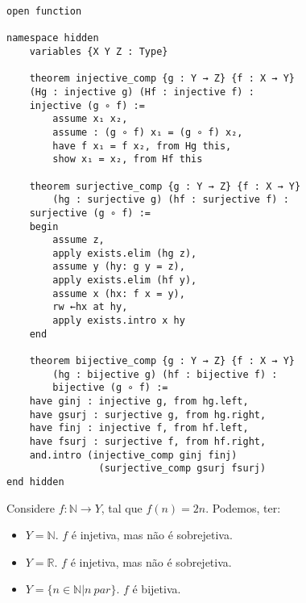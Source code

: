\begin{lstlisting}
open function

namespace hidden
    variables {X Y Z : Type}

    theorem injective_comp {g : Y → Z} {f : X → Y}
    (Hg : injective g) (Hf : injective f) :
    injective (g ∘ f) :=
        assume x₁ x₂,
        assume : (g ∘ f) x₁ = (g ∘ f) x₂,
        have f x₁ = f x₂, from Hg this,
        show x₁ = x₂, from Hf this

    theorem surjective_comp {g : Y → Z} {f : X → Y}
        (hg : surjective g) (hf : surjective f) :
    surjective (g ∘ f) :=
    begin
        assume z,
        apply exists.elim (hg z),
        assume y (hy: g y = z),
        apply exists.elim (hf y),
        assume x (hx: f x = y),
        rw ←hx at hy,
        apply exists.intro x hy
    end

    theorem bijective_comp {g : Y → Z} {f : X → Y}
        (hg : bijective g) (hf : bijective f) :
        bijective (g ∘ f) :=
    have ginj : injective g, from hg.left,
    have gsurj : surjective g, from hg.right,
    have finj : injective f, from hf.left,
    have fsurj : surjective f, from hf.right,
    and.intro (injective_comp ginj finj)
                (surjective_comp gsurj fsurj)
end hidden
\end{lstlisting}

\begin{example}
    Considere $f: \mathbb{N} \to Y$, tal que $f(n) = 2n$. Podemos, ter:
    \begin{itemize}
        \item $Y = \mathbb{N}$. $f$ é injetiva, mas não é sobrejetiva.
        \item $Y = \mathbb{R}$. $f$ é injetiva, mas não é sobrejetiva.
        \item $Y = \{n \in \mathbb{N} | n~par\}$. $f$ é bijetiva.
    \end{itemize}
\end{example}